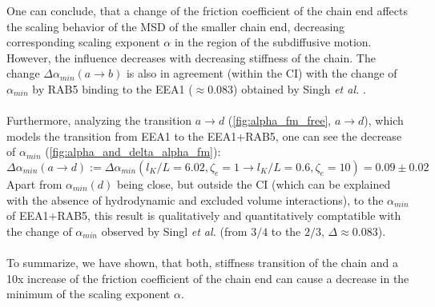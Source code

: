 \documentclass[
    paper=A4,pagesize=automedia,fontsize=12pt,
    BCOR=15mm,DIV=22,
    twoside,headinclude,footinclude=false,
    fleqn,             %
    bibliography=totocnumbered,          %
    listof=totoc,                %
    listof=flat,                 %
    cleardoublepage=empty      %
    numbers=endperiod
]{scrartcl}
\begin{document}
One can conclude, that a
change of the friction coefficient of the chain end affects the scaling behavior
of the MSD of the smaller chain end, decreasing corresponding scaling exponent $\alpha$ 
in the region of the subdiffusive motion. However, the influence decreases with 
decreasing stiffness of the chain. The change $\Delta \alpha_{min}(a \rightarrow b)$ is also
in agreement (within the CI) with the change of $\alpha_{min}$ by RAB5 binding to the EEA1 
($\approx 0.083$) obtained by Singh \emph{et al.} \cite{Singh:2022}.
\\
\\
Furthermore, analyzing the transition $a \rightarrow d$ (\autoref{fig:alpha_fm_free}, $a \rightarrow d$), 
which models the transition from 
EEA1 to the EEA1+RAB5, one can see the decrease of $\alpha_{min}$ (\autoref{fig:alpha_and_delta_alpha_fm}):
\begin{equation} \label{eq:alpha_min_l_p_zeta_e_trans}
    \Delta \alpha_{min}(a \rightarrow d) := \Delta \alpha_{min}(l_K/L=6.02,\zeta_e=1 \rightarrow l_K/L=0.6,\zeta_e=10) = 0.09 \pm 0.02
\end{equation}
Apart from $\alpha_{min}(d)$ being close, but outside the CI 
(which can be explained with the absence of hydrodynamic 
and excluded volume interactions), to the $\alpha_{min}$
of EEA1+RAB5, this result is qualitatively and quantitatively comptatible with the change
of $\alpha_{min}$ observed by Singl \emph{et al.} \cite{Singh:2022} 
(from $3/4$ to the $2/3$, $\Delta\approx0.083$).
\\
\\
To summarize, we have shown, that both, stiffness transition of the chain
and a 10x increase of the friction coefficient of the chain end can cause a decrease 
in the minimum of the scaling exponent $\alpha$.
\end{document}
